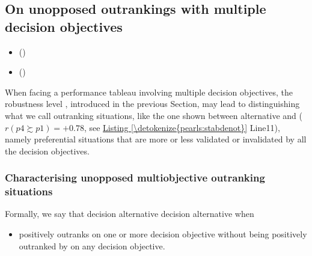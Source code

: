 \documentclass[a4paper,12pt,english]{sphinxhowto}
\begin{document}
\subsection{On unopposed outrankings with multiple decision objectives}
\label{\detokenize{pearls:on-unopposed-outrankings-with-multiple-decision-objectives}}\label{\detokenize{pearls:unopposed-outranking-tutorial-label}}
\begin{sphinxcontents}
\begin{itemize}
\item {} 
\sphinxAtStartPar
{}\label{\detokenize{pearls:id147}}{\hyperref[\detokenize{pearls:characterising-unopposed-multiobjective-outranking-situations}]{}} ()

\item {} 
\sphinxAtStartPar
{}\label{\detokenize{pearls:id148}}{\hyperref[\detokenize{pearls:computing-unopposed-multiobjective-choice-recommendations}]{}} ()

\end{itemize}
\end{sphinxcontents}

\sphinxAtStartPar
When facing a performance tableau involving multiple decision objectives, the robustness level , introduced in the previous Section, may lead to distinguishing what we call  outranking situations, like the one shown between alternative  and  (\(r(p4 \succsim p1) = +0.78\), see \hyperref[\detokenize{pearls:stabdenot}]{Listing \ref{\detokenize{pearls:stabdenot}}} Line11), namely preferential situations that are more or less validated or invalidated by all the decision objectives.


\subsubsection{Characterising unopposed multiobjective outranking situations}
\label{\detokenize{pearls:characterising-unopposed-multiobjective-outranking-situations}}
\sphinxAtStartPar
Formally, we say that decision alternative   decision alternative   when
\begin{itemize}
\item {} 
\sphinxAtStartPar
{} positively outranks  on one or more decision objective without  being positively outranked by  on any decision objective.

\end{itemize}
\end{document}
